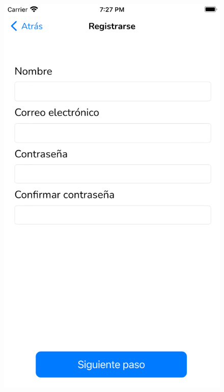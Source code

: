 \begin{appendices}
\begin{figure}[H]
    \begin{minipage}{0.3\textwidth}
        \centering
        \includegraphics[cframe=black 2pt, width=1\linewidth]{images/manual/registro1.png}
    \end{minipage}
    \begin{minipage}{0.3\textwidth}
        \centering

\end{minipage}
\end{figure}
\end{appendices}
